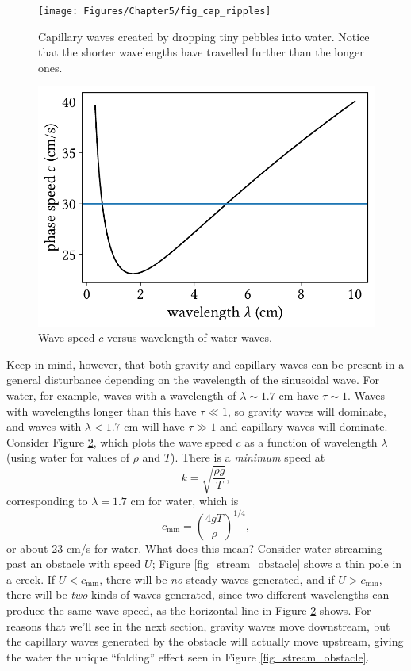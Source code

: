 \begin{figure}
\centering\texttt{[image: Figures/Chapter5/fig\_cap\_ripples]}
\caption{Capillary waves created by dropping tiny pebbles into water.  Notice that the shorter wavelengths have travelled further than the longer ones.}
\label{fig_cap_ripples}
\end{figure}


\begin{figure}
\centering\includegraphics[width=0.7\linewidth]{Figures/Chapter5/fig_grav_and_cap}
\caption{Wave speed $c$ versus wavelength of water waves.}
\label{fig_grav_and_cap}
\end{figure}


Keep in mind, however, that both gravity and capillary waves can be present in a general disturbance depending on the wavelength of the sinusoidal wave.  For water, for example, waves with a wavelength of $\lambda \sim 1.7$ cm have $\tau \sim 1$.  Waves with wavelengths longer than this have $\tau \ll 1$, so gravity waves will dominate, and waves with $\lambda < 1.7$ cm will have $\tau \gg 1$ and capillary waves will dominate.  Consider Figure \ref{fig_grav_and_cap}, which plots the wave speed $c$ as a function of wavelength $\lambda$ (using water for values of $\rho$ and $T$).  There is a \emph{minimum} speed at
\[
k = \sqrt{\frac{\rho g}{T}},
\]
corresponding to $\lambda = 1.7$ cm for water, which is
\begin{equation}
c_\text{min} = \left( \frac{4gT}{\rho} \right)^{1/4},
\end{equation}
or about 23 cm/s for water.  What does this mean?  Consider water streaming past an obstacle with speed $U$; Figure \ref{fig_stream_obstacle} shows a thin pole in a creek.  If $U < c_\text{min}$, there will be \emph{no} steady waves generated, and if $U > c_\text{min}$, there will be \emph{two} kinds of waves generated, since two different wavelengths can produce the same wave speed, as the horizontal line in Figure \ref{fig_grav_and_cap} shows.  For reasons that we'll see in the next section, gravity waves move downstream, but the capillary waves generated by the obstacle will actually move upstream, giving the water the unique ``folding'' effect seen in Figure \ref{fig_stream_obstacle}.

